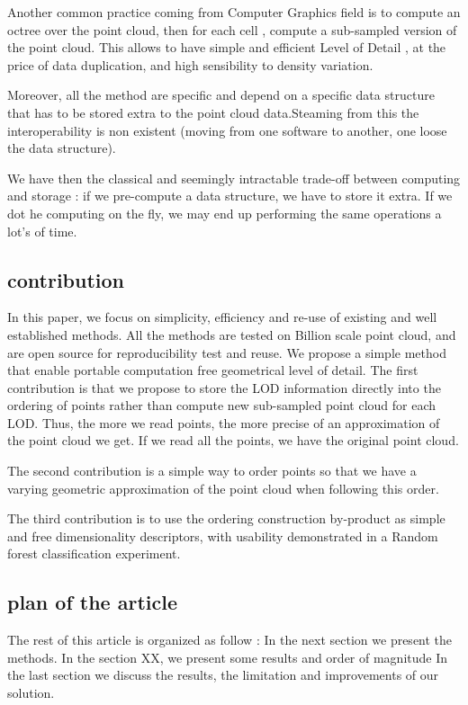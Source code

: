 		Another common practice coming from Computer Graphics field is to compute an octree over the point cloud, then for each cell , compute a sub-sampled version of the point cloud.
		This allows to have simple and efficient Level of Detail , at the price of data duplication, and high sensibility to density variation.
		
		Moreover, all the method are specific and depend on a specific data structure that has to be stored extra to the point cloud data.Steaming from this the interoperability is non existent (moving from one software to another, one loose the data structure).
		
		We have then the classical and seemingly intractable trade-off between computing and storage : if we pre-compute a data structure, we have to store it extra. If we dot he computing on the fly, we may end up performing the same operations a lot's of time.
	
	\subsection{contribution}
		
		In this paper, we focus on simplicity, efficiency and re-use of existing and well established methods. All the methods are tested on Billion scale point cloud, and are open source for reproducibility test and reuse.
		We propose a simple method that enable portable computation free geometrical level of detail.
		The first contribution is that we propose to store the LOD information directly into the ordering of points rather than compute new sub-sampled point cloud for each LOD.
		Thus, the more we read points, the more precise of an approximation of the point cloud we get. If we read all the points, we have the original point cloud.
		
		The second contribution is a simple way to order points so that we have a varying geometric approximation of the point cloud when following this order.
		
		The third contribution is to use the ordering construction by-product as simple and free dimensionality descriptors, with usability demonstrated in a Random forest classification experiment.
			
		
	\subsection{plan of the article}
		The rest of this article is organized as follow :
		In the next section we present the methods.  
		In the section XX, we present some results and order of magnitude
		In the last section we discuss the results, the limitation and improvements of our solution.

